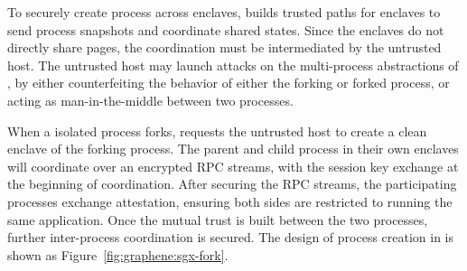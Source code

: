 To securely create process across enclaves,
\graphenesgx{} builds trusted paths for enclaves to send process snapshots and coordinate shared states.
Since the enclaves do not directly share pages,
the coordination must be intermediated by the untrusted host.
The untrusted host may launch attacks on the multi-process abstractions of \graphenesgx{},
by either counterfeiting the behavior of either the forking or forked process,
or acting as man-in-the-middle between two processes.


When a isolated process forks,
\graphenesgx{} requests the untrusted host to create a clean enclave
of the forking process.
The parent and child process in their own enclaves
will coordinate over an encrypted RPC streams,
with the session key exchange at the beginning of coordination.
After securing the RPC streams,
the participating processes exchange attestation,
ensuring both sides are restricted to running the same application.
Once the mutual trust is built between the two processes,
further inter-process coordination is secured.
The design of process creation in \graphenesgx{} is shown as Figure~\ref{fig:graphene:sgx-fork}.

%
%
%
%
%
%

